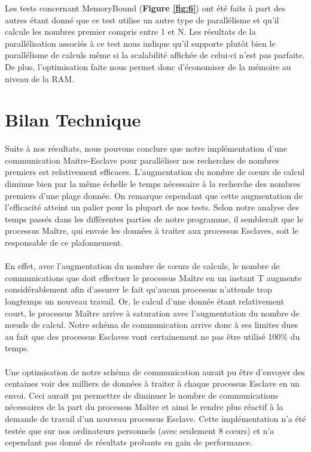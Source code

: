 	Les tests concernant MemoryBound (\textbf{Figure \ref{fig:6}}) ont été faits à part des autres étant donné que ce test utilise un autre type de parallélisme et qu'il calcule les nombres premier compris entre 1 et N. Les résultats de la parallélisation associés à ce test nous indique qu'il supporte plutôt bien le parallélisme de calculs même si la scalabilité affichée de celui-ci n'est pas parfaite. De plus, l'optimisation faite nous permet donc d'économiser de la mémoire au niveau de la RAM.
	\section{Bilan Technique}	
		
Suite à nos résultats, nous pouvons conclure que notre implémentation d'une communication Maitre-Esclave pour paralléliser nos recherches de nombres premiers est relativement efficaces.
L'augmentation du nombre de cœurs de calcul diminue bien par la même échelle le temps nécessaire à la recherche des nombres premiers d'une plage donnée.
On remarque cependant que cette augmentation de l'efficacité atteint un palier pour la plupart de nos tests. Selon notre analyse des temps passés dans les différentes parties de notre programme, il semblerait que le processus Maître, qui envoie les données à traiter aux processus Esclaves, soit le responsable de ce plafonnement.
\paragraph{}En effet, avec l'augmentation du nombre de cœurs de calculs, le nombre de communications que doit effectuer le processus Maître en un instant T augmente considérablement afin d'assurer le fait qu'aucun processus n'attende trop longtemps un nouveau travail.
Or, le calcul d'une donnée étant relativement court, le processus Maître arrive à saturation avec l'augmentation du nombre de nœuds de calcul.
Notre schéma de communication arrive donc à ses limites dues au fait que des processus Esclaves vont certainement ne pas être utilisé 100\% du temps.

\paragraph{}Une optimisation de notre schéma de communication aurait pu être d'envoyer des centaines voir des milliers de données à traiter à chaque processus Esclave en un envoi.
Ceci aurait pu permettre de diminuer le nombre de communications nécessaires de la part du processus Maître et ainsi le rendre plus réactif à la demande de travail d'un nouveau processus Esclave.
Cette implémentation n'a été testée que sur nos ordinateurs personnels (avec seulement 8 cœurs) et n'a cependant pas donné de résultats probants en gain de performance.

